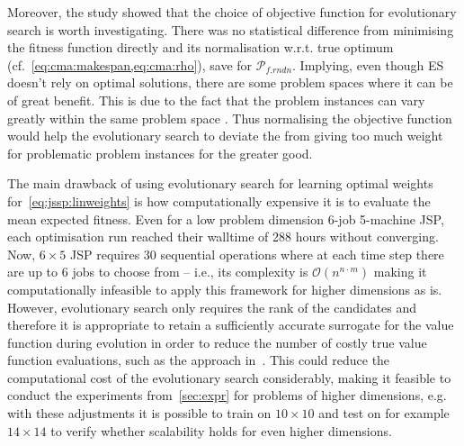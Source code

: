 \documentclass[a4paper,twoside]{article}
\begin{document}
Moreover, the study showed that the choice of objective function  for evolutionary search is worth investigating. There was no statistical difference from minimising the fitness function directly and its normalisation w.r.t. true optimum (cf.~\cref{eq:cma:makespan,eq:cma:rho}), save for $\mathcal{P}_{f.rndn}$. Implying, even though ES doesn't rely on optimal solutions, there are some problem spaces where it can be of great benefit. This is due to the fact that the problem instances can vary greatly within the same problem space \cite{InRu12}. Thus normalising the objective function would help the evolutionary search to deviate the from giving too much weight for problematic problem instances for the greater good.


The main drawback of using evolutionary search for learning optimal weights for~\cref{eq:jssp:linweights} is how computationally expensive it is to evaluate the mean expected fitness. Even for a low problem dimension 6-job 5-machine JSP, each optimisation run reached their walltime of 288 hours without converging. Now, $6\times5$ JSP requires 30 sequential operations where at each time step there are up to $6$ jobs to choose from -- i.e., its complexity is $\mathcal{O}(n^{n\cdot m})$ making it computationally infeasible to apply this framework for higher dimensions as is. 
However, evolutionary search only requires the rank of the candidates and therefore it is appropriate to retain a sufficiently accurate surrogate for the value function during evolution in order to reduce the number of costly true value function evaluations, such as the approach in~\cite{InRu11b}. This could reduce the computational cost of the evolutionary search considerably, making it feasible to conduct the experiments from~\cref{sec:expr} for problems of higher dimensions, e.g. with these adjustments it is possible to train on $10\times10$ and test on for example $14\times14$ to verify whether scalability holds for even higher dimensions.  
\end{document}

